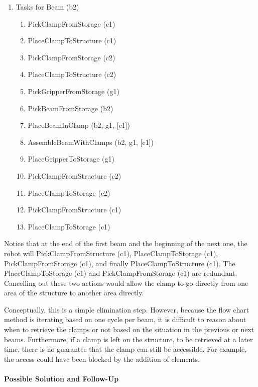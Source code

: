 \begin{enumerate}[nosep]
	\item {\footnotesize Tasks for Beam (b2) }
    \begin{enumerate}
        \item {\footnotesize PickClampFromStorage (c1)}
        \item {\footnotesize PlaceClampToStructure (c1)}
        \item {\footnotesize PickClampFromStorage (c2)}
        \item {\footnotesize PlaceClampToStructure (c2)}
        \item {\footnotesize PickGripperFromStorage (g1)}
        \item {\footnotesize PickBeamFromStorage (b2)}
        \item {\footnotesize PlaceBeamInClamp (b2, g1, [c1])}
        \item {\footnotesize AssembleBeamWithClamps (b2, g1, [c1])}
        \item {\footnotesize PlaceGripperToStorage (g1)}
        \item {\footnotesize PickClampFromStructure (c2)}
        \item {\footnotesize PlaceClampToStorage (c2)}
        \item {\footnotesize PickClampFromStructure (c1)}
        \item {\footnotesize PlaceClampToStorage (c1)}
    \end{enumerate}

\end{enumerate}

Notice that at the end of the first beam and the beginning of the next one, the robot will PickClampFromStructure (c1), PlaceClampToStorage (c1), PickClampFromStorage (c1), and finally PlaceClampToStructure (c1). The PlaceClampToStorage (c1) and PickClampFromStorage (c1) are redundant. Cancelling out these two actions would allow the clamp to go directly from one area of the structure to another area directly.

Conceptually, this is a simple elimination step. However, because the flow chart method is iterating based on one cycle per beam, it is difficult to reason about when to retrieve the clamps or not based on the situation in the previous or next beams. Furthermore, if a clamp is left on the structure, to be retrieved at a later time, there is no guarantee that the clamp can still be accessible. For example, the access could have been blocked by the addition of elements.

\paragraph{Possible Solution and Follow-Up}

